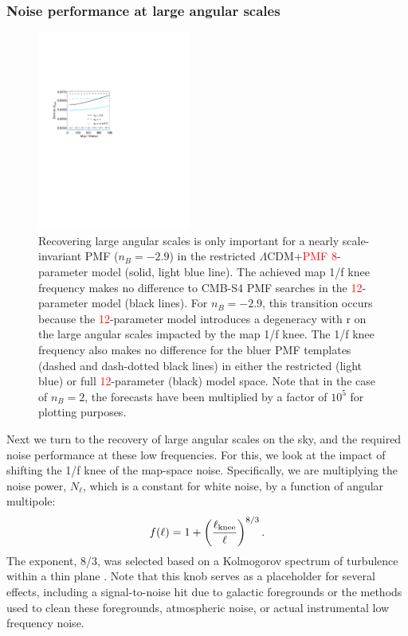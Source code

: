 \documentclass[apj]{emulateapj}
\newcommand{\lcdm}{\ensuremath{\Lambda}CDM}
\newcommand{\be}{\begin{equation}}
\newcommand{\ee}{\end{equation}}
\newcommand{\changed}[1]{\textcolor{Red}{#1}}
\begin{document}
\subsubsection{Noise performance at large angular scales}

\begin{figure}[htb]\centering
\includegraphics[width=0.45\textwidth,clip,trim={2.cm 12.5cm 11cm 7.5cm}]{pmf_knee.pdf}
  \caption[Map knee dependence]{
  Recovering large angular scales is only important for a nearly scale-invariant PMF ($n_B = -2.9$) in the restricted \lcdm{}+\changed{PMF 8}-parameter model (solid, light blue line). 
The achieved map 1/f knee frequency makes no difference to CMB-S4 PMF searches in the \changed{12}-parameter model (black lines). 
  For $n_B=-2.9$, this transition occurs because the \changed{12}-parameter model introduces a degeneracy with r on the large angular scales impacted by the map 1/f knee. 
  The 1/f knee frequency also makes no difference for the bluer PMF templates  (dashed and dash-dotted black lines) in either the restricted (light blue) or full \changed{12}-parameter (black) model space. 
     Note that in the case of $n_B=2$, the forecasts have been multiplied by a factor of $10^5$ for plotting purposes. 
    \label{fig:knee}
  }
\end{figure}

Next we turn to the recovery of large angular scales on the sky, and the required noise performance at these low frequencies. 
For this, we look at the impact of shifting the 1/f knee of the map-space noise. 
Specifically, we are multiplying the noise power, $N_\ell$, which is a constant for white noise,  by a function of angular multipole:
\be \label{eqn:knee}
f(\ell) = 1 + \left(\frac{\ell_{\rm knee}}{\ell}\right)^{8/3}.
\ee 
The exponent, 8/3, was selected based on a Kolmogorov spectrum of turbulence within a thin plane \citep{lay00}. %
Note that this knob  serves as a placeholder for several effects, including a signal-to-noise hit due to galactic foregrounds or the methods used to clean these foregrounds, atmospheric noise, or actual instrumental low frequency noise. 
\end{document}
